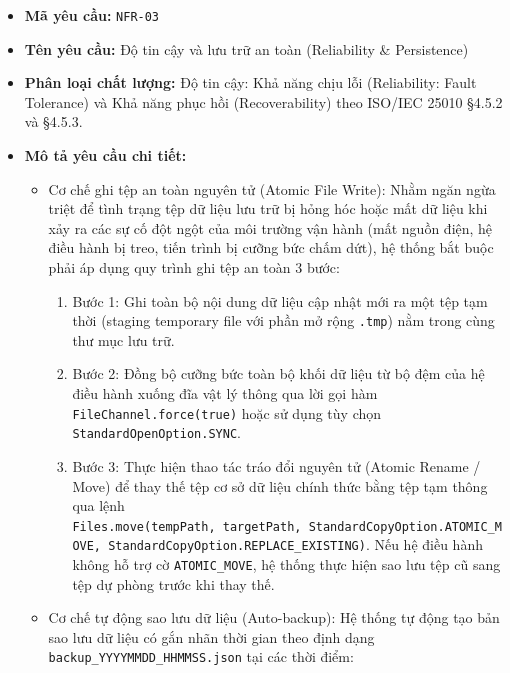 \documentclass[11pt,a4paper]{article}
\providecommand{\tightlist}{
  \setlength{\itemsep}{0pt}\setlength{\parskip}{0pt}}
\begin{document}
\begin{itemize}
\tightlist
\item
  \textbf{Mã yêu cầu:} \texttt{NFR-03}
\item
  \textbf{Tên yêu cầu:} Độ tin cậy và lưu trữ an toàn (Reliability \&
  Persistence)
\item
  \textbf{Phân loại chất lượng:} Độ tin cậy: Khả năng chịu lỗi
  (Reliability: Fault Tolerance) và Khả năng phục hồi (Recoverability)
  theo ISO/IEC 25010 §4.5.2 và §4.5.3.
\item
  \textbf{Mô tả yêu cầu chi tiết:}

  \begin{itemize}
  \tightlist
  \item
    Cơ chế ghi tệp an toàn nguyên tử (Atomic File Write): Nhằm ngăn ngừa
    triệt để tình trạng tệp dữ liệu lưu trữ bị hỏng hóc hoặc mất dữ liệu
    khi xảy ra các sự cố đột ngột của môi trường vận hành (mất nguồn
    điện, hệ điều hành bị treo, tiến trình bị cưỡng bức chấm dứt), hệ
    thống bắt buộc phải áp dụng quy trình ghi tệp an toàn 3 bước:

    \begin{enumerate}
    \def\labelenumi{\arabic{enumi}.}
    \tightlist
    \item
      Bước 1: Ghi toàn bộ nội dung dữ liệu cập nhật mới ra một tệp tạm
      thời (staging temporary file với phần mở rộng \texttt{.tmp}) nằm
      trong cùng thư mục lưu trữ.
    \item
      Bước 2: Đồng bộ cưỡng bức toàn bộ khối dữ liệu từ bộ đệm của hệ
      điều hành xuống đĩa vật lý thông qua lời gọi hàm
      \texttt{FileChannel.force(true)} hoặc sử dụng tùy chọn
      \texttt{StandardOpenOption.SYNC}.
    \item
      Bước 3: Thực hiện thao tác tráo đổi nguyên tử (Atomic Rename /
      Move) để thay thế tệp cơ sở dữ liệu chính thức bằng tệp tạm thông
      qua lệnh
      \texttt{Files.move(tempPath,\ targetPath,\ StandardCopyOption.ATOMIC\_MOVE,\ StandardCopyOption.REPLACE\_EXISTING)}.
      Nếu hệ điều hành không hỗ trợ cờ \texttt{ATOMIC\_MOVE}, hệ thống
      thực hiện sao lưu tệp cũ sang tệp dự phòng trước khi thay thế.
    \end{enumerate}
  \item
    Cơ chế tự động sao lưu dữ liệu (Auto-backup): Hệ thống tự động tạo
    bản sao lưu dữ liệu có gắn nhãn thời gian theo định dạng
    \texttt{backup\_YYYYMMDD\_HHMMSS.json} tại các thời điểm:


\end{itemize}
\end{itemize}
\end{document}
